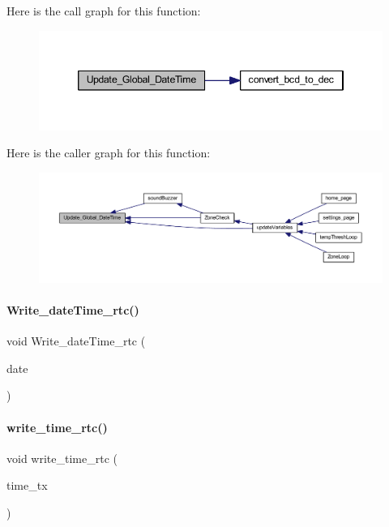 Here is the call graph for this function\+:
\nopagebreak
\begin{figure}[H]
\begin{center}
\leavevmode
\includegraphics[width=346pt]{a00017_a93b2ace39d0d582b18b136c908d8f092_cgraph}
\end{center}
\end{figure}
Here is the caller graph for this function\+:
\nopagebreak
\begin{figure}[H]
\begin{center}
\leavevmode
\includegraphics[width=350pt]{a00017_a93b2ace39d0d582b18b136c908d8f092_icgraph}
\end{center}
\end{figure}
\mbox{\label{a00017_a4445924dfb1ef2a828793deff1d6efc0}} 
\paragraph{Write\+\_\+date\+Time\+\_\+rtc()}
{\footnotesize\ttfamily void Write\+\_\+date\+Time\+\_\+rtc (\begin{DoxyParamCaption}\item[{\textbf{ Date\+Time} $\ast$}]{date }\end{DoxyParamCaption})}

\mbox{\label{a00017_aadecf4eb7d23c63d1216ced71440654e}} 
\paragraph{write\+\_\+time\+\_\+rtc()}
{\footnotesize\ttfamily void write\+\_\+time\+\_\+rtc (\begin{DoxyParamCaption}\item[{unsigned char}]{time\+\_\+tx }\end{DoxyParamCaption})}

